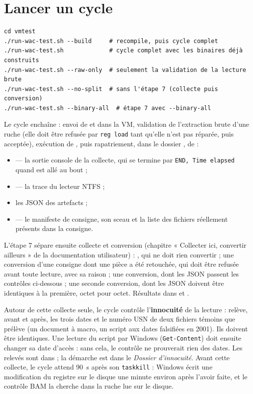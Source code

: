 \documentclass[11pt,a4paper,oneside]{report}
\begin{document}
\section{Lancer un cycle}

\begin{lstlisting}
cd vmtest
./run-wac-test.sh --build     # recompile, puis cycle complet
./run-wac-test.sh             # cycle complet avec les binaires déjà construits
./run-wac-test.sh --raw-only  # seulement la validation de la lecture brute
./run-wac-test.sh --no-split  # sans l'étape 7 (collecte puis conversion)
./run-wac-test.sh --binary-all  # étape 7 avec --binary-all
\end{lstlisting}

Le cycle enchaîne : envoi de  et 
dans la VM, validation de l'extraction brute d'une ruche (elle doit être refusée
par \texttt{reg load} tant qu'elle n'est pas réparée, puis acceptée), exécution
de \wac{}, puis rapatriement, dans le dossier
, de :

\begin{itemize}
  \item {} — la sortie console de la collecte, qui se termine par
    \texttt{END, Time elapsed} quand \wac{} est allé au bout ;
  \item {} — la trace du lecteur NTFS ;
  \item les JSON des artefacts ;
  \item {} — le manifeste de consigne, son sceau et la liste
    des fichiers réellement présents dans la consigne.
\end{itemize}

L'étape 7 sépare ensuite collecte et conversion (chapitre « Collecter ici,
convertir ailleurs » de la documentation utilisateur) : 
 , qui ne doit rien convertir ; une conversion d'une
consigne dont une pièce a été retouchée, qui doit être refusée avant toute
lecture, avec sa raison ; une conversion, dont les JSON passent les contrôles
ci-dessous ; une seconde conversion, dont les JSON doivent être identiques à la
première, octet pour octet. Résultats dans  et
.

Autour de cette collecte seule, le cycle contrôle l'\textbf{innocuité} de la
lecture :  relève, avant et après, les trois
dates et le numéro USN de deux fichiers témoins que  prélève (un
document à macro, un script aux dates falsifiées en 2001). Ils doivent être
identiques. Une lecture du script par Windows (\texttt{Get-Content}) doit
ensuite changer sa date d'accès : sans cela, le contrôle ne prouverait rien des
dates. Les relevés sont dans  ; la démarche est dans
le \emph{Dossier d'innocuité}. Avant cette collecte, le cycle attend 90~s après
son \texttt{taskkill} : Windows écrit une modification du registre sur le
disque une minute environ après l'avoir faite, et le contrôle BAM la cherche
dans la ruche lue sur le disque.
\end{document}
